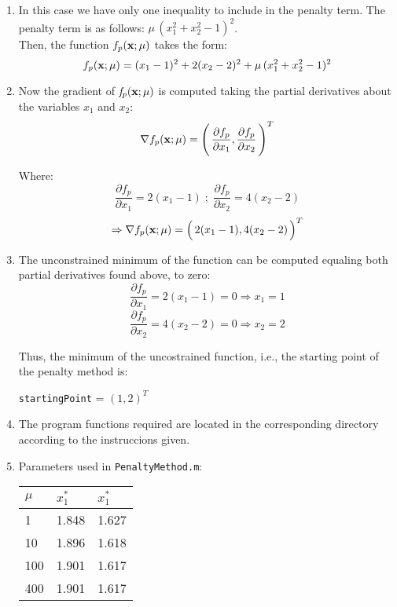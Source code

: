 \documentclass[18pt,a4paper]{article}
\begin{document}
\begin{enumerate}

	\item In this case we have only one inequality to include in the 
	penalty term. The penalty term is as follows: $\mu\, (x_1^2 + x_2^2 - 1)^2$.\\
	Then, the function $f_p({\bf x};\mu)$ takes the form: $$f_p({\bf x};\mu) = 
	(x_1-1)^2 + 2(x_2-2)^2 + \mu\, (x_1^2 + x_2^2 - 1)^2$$
	
	\item Now the gradient of ${\it f}_p({\bf x};\mu)$ is computed taking 
	the partial derivatives about the variables $x_1$ and $x_2$: 
	$$\nabla f_p({\bf x};\mu) = \Biggl(\,\frac{\partial f_p}{\partial 
	x_1},\frac{\partial f_p}{\partial x_2}\,\Biggr)^T$$
	
	Where:
	$$\dfrac{\partial f_{p}}{\partial x_1} = 2(x_1 - 1)\; ; \;\dfrac{\partial f_{p}}{\partial x_2} = 4(x_2 - 2)$$
	$$\Rightarrow \nabla f_p({\bf x};\mu) = \Bigl(\,2(x_1 - 1), 4(x_2 - 2)\,\Bigr)^T$$
	
	\item The unconstrained minimum of the function can be computed 
	equaling both partial derivatives found above, to zero:
	$$\dfrac{\partial f_{p}}{\partial x_1} = 2(x_1 - 1) = 0 \Rightarrow 
	x_1 = 1$$	
	$$\dfrac{\partial f_{p}}{\partial x_2} = 4(x_2 - 2) = 0 \Rightarrow 
	x_2 = 2$$
	
	Thus, the minimum of the uncostrained function, i.e., the starting 
	point of the penalty method is:	\begin{center}{\tt startingPoint} = 
	$(1,2)^T$ \end{center}
	
	\item The program functions required are located in the corresponding directory according to the instruccions given.
	
	\item Parameters used in {\tt PenaltyMethod.m}:
		
		\begin{table}[h]
			\centering
			\begin{tabular}{lll}\hline
				$\mu$ 	& $x_1^{*}$ 		& $x_1^{*}$\\ \hline \hline
				1   	& 1.848         & 1.627 \\ %
				10  	& 1.896         & 1.618 \\ %
				100 	& 1.901         & 1.617 \\ %
				400 	& 1.901         & 1.617 \\ \hline 
			\end{tabular}
		\end{table}
	
\end{enumerate}
\end{document}
